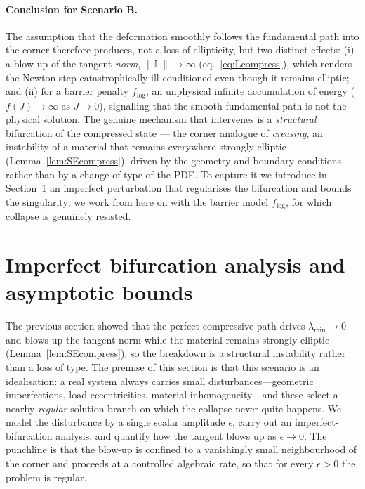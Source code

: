 \paragraph{Conclusion for Scenario B.}
The assumption that the deformation smoothly follows the fundamental path into the corner therefore produces, not a
loss of ellipticity, but two distinct effects: (i) a blow-up of the tangent \emph{norm}, $\|\mathbb{L}\|\to\infty$
(eq.~\eqref{eq:Lcompress}), which renders the Newton step catastrophically ill-conditioned even though it remains
elliptic; and (ii) for a barrier penalty $f_{\log}$, an unphysical infinite accumulation of energy ($f(J)\to\infty$ as
$J\to0$), signalling that the smooth fundamental path is not the physical solution. The genuine mechanism that
intervenes is a \emph{structural} bifurcation of the compressed state --- the corner analogue of \emph{creasing}, an
instability of a material that remains everywhere strongly elliptic (Lemma~\ref{lem:SEcompress}), driven by the
geometry and boundary conditions rather than by a change of type of the PDE. To capture it we introduce in
Section~\ref{sec:iba} an imperfect perturbation that regularises the bifurcation and bounds the singularity; we work
from here on with the barrier model $f_{\log}$, for which collapse is genuinely resisted.

\section{Imperfect bifurcation analysis and asymptotic bounds}
\label{sec:iba}

The previous section showed that the perfect compressive path drives $\lambda_{\min}\to0$ and blows up the tangent norm
while the material remains strongly elliptic (Lemma~\ref{lem:SEcompress}), so the breakdown is a structural instability
rather than a loss of type. The premise of this section is that this scenario is an idealisation: a real system always
carries small disturbances---geometric imperfections, load eccentricities, material inhomogeneity---and these select a
nearby \emph{regular} solution branch on which the collapse never quite happens. We model the disturbance by a single
scalar amplitude $\epsilon$, carry out an imperfect-bifurcation analysis, and quantify how the tangent blows up as
$\epsilon\to0$. The punchline is that the blow-up is confined to a vanishingly small neighbourhood of the corner and
proceeds at a controlled algebraic rate, so that for every $\epsilon>0$ the problem is regular.

